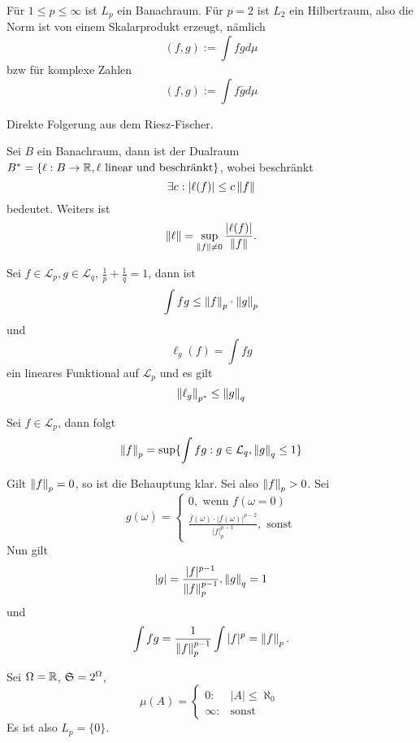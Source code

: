 	\begin{satz}
		Für $1\le p\le\infty$ ist $L_p$ ein Banachraum. Für $p=2$ ist $L_2$ ein Hilbertraum, also die Norm ist von einem Skalarprodukt erzeugt, nämlich
		\[ (f,g):=\int fgd\mu \]
		bzw für komplexe Zahlen
		\[ (f,g):=\int f\overline{g}d \mu \]
	\end{satz}

	\begin{bew}
		Direkte Folgerung aus dem Riesz-Fischer.
	\end{bew}

	\begin{bem}
		Sei $B$ ein Banachraum, dann ist der Dualraum $B^*=\{\ell: B\to\R, \ell\text{ linear und beschränkt}\}$, wobei beschränkt
		\[ \exists c: |\ell(f)|\le c\norm{f} \]
		bedeutet. Weiters ist
		\[ \norm{\ell}=\sup_{\norm{f}\neq 0}\frac{|\ell(f)|}{\norm{f}}. \]
	\end{bem}

	\begin{bem}
		Sei $f\in\mathcal{L}_p, g\in\mathcal{L}_q$, $\frac{1}{p}+\frac{1}{q}=1$, dann ist
		\[ \int fg\le\norm{f}_p\cdot\norm{g}_p \]
		und 
		\[ \ell_g(f)=\int fg \]
		ein lineares Funktional auf $\mathcal{L}_p$ und es gilt
		\[ \norm{\ell_g}_{p^*}\le\norm{g}_q \]
	\end{bem}
	
	\begin{satz}
		Sei $f\in\mathcal{L}_p$, dann folgt
		\[ \norm{f}_p=\sup\{\int fg: g\in\mathcal{L}_q, \norm{g}_q\le1\} \]
	\end{satz}

	\begin{bew}
		Gilt $\norm{f}_p=0$, so ist die Behauptung klar.\newline
		Sei also $\norm{f}_p>0$. Sei
		\[ g(\omega)=\begin{cases}
			0, \text{ wenn }f(\omega=0)\\
			\frac{\overline{f}(\omega)\cdot|f(\omega)|^{p-2}}{|f|_p^{p-1}}, \text{ sonst}
		\end{cases} \]
		Nun gilt
		\[ |g|=\frac{|f|^{p-1}}{\norm{f}_p^{p-1}}, \norm{g}_q=1 \]
		und
		\[ \int fg=\frac{1}{\norm{f}_p^{p-1}}\int|f|^p=\norm{f}_p. \]
	\end{bew}

	\begin{bsp}
		Sei $\Omega=\R$, $\S=2^\Omega$, 
		\[ \mu(A)=\begin{cases}
		0: & |A|\le\aleph_0 \\ \infty: & \text{sonst}
		\end{cases} \]
		Es ist also $L_p=\{0\}$. 
	\end{bsp}

